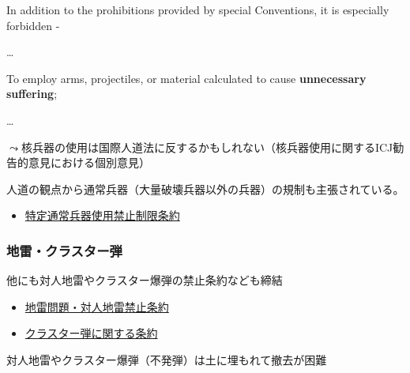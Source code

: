 \documentclass[
  xelatex,
  ja=standard]{bxjsarticle}
\providecommand{\tightlist}{%
  \setlength{\itemsep}{0pt}\setlength{\parskip}{0pt}}\usepackage{longtable,booktabs,array}
\begin{document}
\begin{tcolorbox}[enhanced jigsaw, opacityback=0, bottomtitle=1mm, arc=.35mm, opacitybacktitle=0.6, title=\textcolor{quarto-callout-note-color}{\faInfo}\hspace{0.5em}{\href{https://avalon.law.yale.edu/20th_century/hague04.asp}{ハーグ陸戦条約}　第23条}, bottomrule=.15mm, coltitle=black, toptitle=1mm, titlerule=0mm, leftrule=.75mm, colframe=quarto-callout-note-color-frame, breakable, left=2mm, rightrule=.15mm, toprule=.15mm, colbacktitle=quarto-callout-note-color!10!white, colback=white]

In addition to the prohibitions provided by special Conventions, it is
especially forbidden -

\ldots{}

To employ arms, projectiles, or material calculated to cause
\textbf{unnecessary suffering};

\ldots{}

\end{tcolorbox}

\(\leadsto\)核兵器の使用は国際人道法に反するかもしれない（核兵器使用に関するICJ勧告的意見における個別意見）

人道の観点から通常兵器（大量破壊兵器以外の兵器）の規制も主張されている。

\begin{itemize}
\tightlist
\item
  \href{https://www.mofa.go.jp/mofaj/gaiko/arms/ccw/ccw.html}{特定通常兵器使用禁止制限条約}
\end{itemize}

\hypertarget{ux5730ux96f7ux30afux30e9ux30b9ux30bfux30fcux5f3e}{%
\subsubsection{地雷・クラスター弾}\label{ux5730ux96f7ux30afux30e9ux30b9ux30bfux30fcux5f3e}}

他にも対人地雷やクラスター爆弾の禁止条約なども締結

\begin{itemize}
\tightlist
\item
  \href{https://www.mofa.go.jp/mofaj/gaiko/arms/mine/genjo.html}{地雷問題・対人地雷禁止条約}
\item
  \href{https://www.mofa.go.jp/mofaj/gaiko/arms/cluster/0812_gh.html}{クラスター弾に関する条約}
\end{itemize}

対人地雷やクラスター爆弾（不発弾）は土に埋もれて撤去が困難
\end{document}
